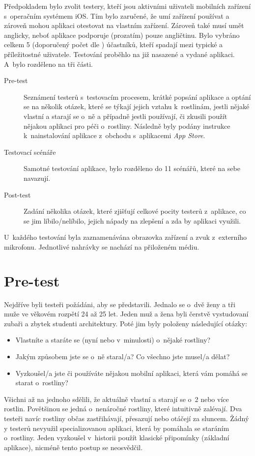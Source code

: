 \documentclass[thesis=M,czech]{FITthesis}[2019/12/23]
\begin{document}
Předpokladem bylo zvolit testery, kteří jsou aktivními uživateli mobilních zařízení s~operačním systémem iOS. Tím bylo zaručené, že umí zařízení používat a zároveň mohou aplikaci otestovat na vlastním zařízení. Zároveň také musí umět anglicky, neboť aplikace podporuje (prozatím) pouze angličtinu. Bylo vybráno celkem 5 (doporučený počet dle \cite{number-of-testers}) účastníků, kteří spadají mezi typické a příležitostné uživatele. Testování proběhlo na již nasazené a vydané aplikaci. A~bylo rozděleno na tři části.

\begin{description}
    \item[Pre-test] Seznámení testerů s~testovacím procesem, krátké popsání aplikace a optání se na několik otázek, které se týkají jejich vztahu k~rostlinám, jestli nějaké vlastní a starají se o~ně a případně jestli používají, či zkusili použít nějakou aplikaci pro péči o~rostliny.  Následně byly podány instrukce k~nainstalování aplikace z~obchodu s~aplikacemi \textit{App Store}.
    \item[Testovací scénáře] Samotné testování aplikace, bylo rozděleno do 11 scénářů, které na sebe navazují.
    \item[Post-test] Zadání několika otázek, které zjišťují celkové pocity testerů z~aplikace, co se jim líbilo/nelíbilo, jejich nápady na zlepšení a zda by aplikaci využili.
\end{description}

U~každého testování byla zaznamenávána obrazovka zařízení a zvuk z~externího mikrofonu. Jednotlivé nahrávky se nachází na přiloženém médiu.

\section{Pre-test}
Nejdříve byli testeři požádáni, aby se představili. Jednalo se o~dvě ženy a tři muže ve věkovém rozpětí 24 až 25 let. Jeden muž a žena byli čerstvě vystudovaní zubaři a zbytek studenti architektury. Poté
jim byly položeny následující otázky:
\begin{itemize}
    \item Vlastníte a staráte se (nyní nebo v~minulosti) o~nějaké rostliny?
    \item Jakým způsobem jste se o~ně staral/a? Co všechno jste musel/a dělat?
    \item Vyzkoušel/a jste či používáte nějakou mobilní aplikaci, která vám pomáhá se starat o~rostliny?
\end{itemize}
Všichni až na jednoho sdělili, že aktuálně vlastní a starají se o~2 nebo více rostlin. Povětšinou se jedná o~nenáročné rostliny, které intuitivně zalévají. Dva testeři navíc rostliny občas zastřihávají, přesazují nebo otáčejí za sluncem. Žádný y testerů nevyužil specializovanou aplikaci, která by pomáhala se staráním o~rostliny. Jeden vyzkoušel v~historii použít klasické připomínky (základní aplikace), nicméně tento postup se neosvědčil.
\end{document}
